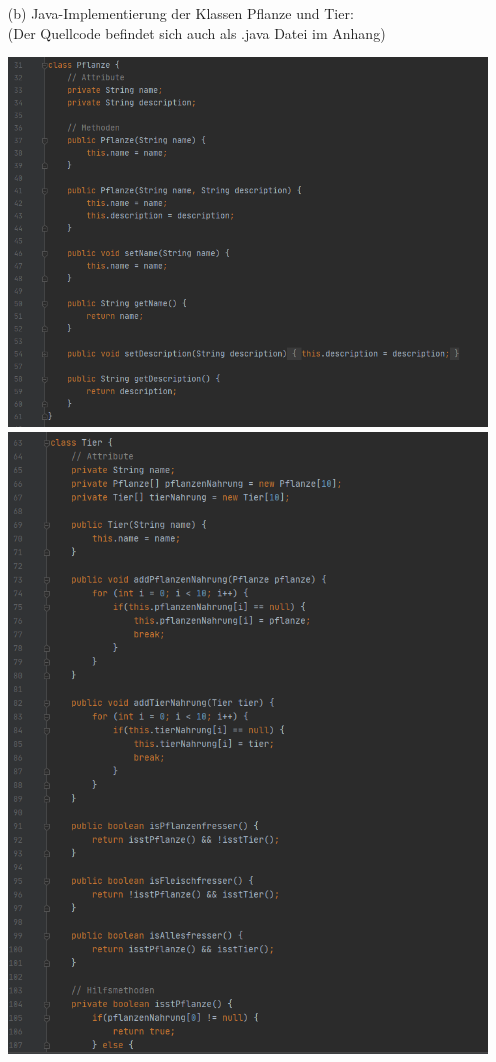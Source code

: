 \documentclass[12pt]{article}
\begin{document}
\begin{enumerate}
	\item[(b)] Java-Implementierung der Klassen Pflanze und Tier: \\
	(Der Quellcode befindet sich auch als .java Datei im Anhang)
	\begin{center}
		\includegraphics[scale=.65]{Quellcode_Pflanze.png}
		\includegraphics[scale=.7]{Quellcode_Tier_1.png}

\end{center}
\end{enumerate}
\end{document}
